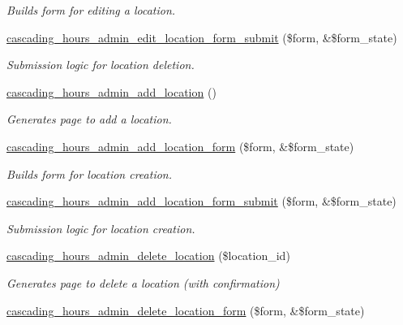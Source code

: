 \begin{DoxyCompactItemize}
\begin{DoxyCompactList}\small\item\em Builds form for editing a location. \end{DoxyCompactList}\item 
\hyperlink{cascading__hours_8admin_8php_a9956edb6cdf88b12f3e7fadcf9e36e4b_a9956edb6cdf88b12f3e7fadcf9e36e4b}{cascading\+\_\+hours\+\_\+admin\+\_\+edit\+\_\+location\+\_\+form\+\_\+submit} (\$form, \&\$form\+\_\+state)
\begin{DoxyCompactList}\small\item\em Submission logic for location deletion. \end{DoxyCompactList}\item 
\hyperlink{cascading__hours_8admin_8php_abf9ca663615d8da220c58f2b39232bc8_abf9ca663615d8da220c58f2b39232bc8}{cascading\+\_\+hours\+\_\+admin\+\_\+add\+\_\+location} ()
\begin{DoxyCompactList}\small\item\em Generates page to add a location. \end{DoxyCompactList}\item 
\hyperlink{cascading__hours_8admin_8php_a4f4ac8068097a34c4e7a11b0157d3fb5_a4f4ac8068097a34c4e7a11b0157d3fb5}{cascading\+\_\+hours\+\_\+admin\+\_\+add\+\_\+location\+\_\+form} (\$form, \&\$form\+\_\+state)
\begin{DoxyCompactList}\small\item\em Builds form for location creation. \end{DoxyCompactList}\item 
\hyperlink{cascading__hours_8admin_8php_a405957141431d872e0a35251149a61bc_a405957141431d872e0a35251149a61bc}{cascading\+\_\+hours\+\_\+admin\+\_\+add\+\_\+location\+\_\+form\+\_\+submit} (\$form, \&\$form\+\_\+state)
\begin{DoxyCompactList}\small\item\em Submission logic for location creation. \end{DoxyCompactList}\item 
\hyperlink{cascading__hours_8admin_8php_a72c673dcf8d8e34684eb8540b3a0332e_a72c673dcf8d8e34684eb8540b3a0332e}{cascading\+\_\+hours\+\_\+admin\+\_\+delete\+\_\+location} (\$location\+\_\+id)
\begin{DoxyCompactList}\small\item\em Generates page to delete a location (with confirmation) \end{DoxyCompactList}\item 
\hyperlink{cascading__hours_8admin_8php_a0c55391c2ef3dedd13b15f979d3340ad_a0c55391c2ef3dedd13b15f979d3340ad}{cascading\+\_\+hours\+\_\+admin\+\_\+delete\+\_\+location\+\_\+form} (\$form, \&\$form\+\_\+state)

\end{DoxyCompactItemize}
